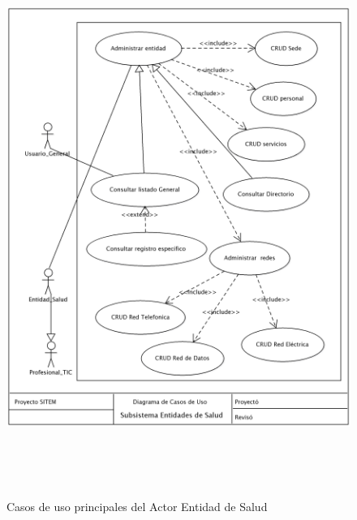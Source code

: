 \begin{figure}
 \centering
 \includegraphics[width=156mm, height=182mm]{casos_entidad.png}
 \caption{Casos de uso principales del Actor Entidad de Salud}
 \label{casos_entidad}
\end{figure}

